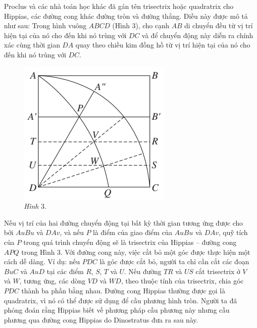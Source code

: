 \begin{multicols}{2}
	\vskip 0.1cm
	Proclus và các nhà toán học khác đã gán tên trisectrix hoặc quadratrix cho Hippias, các đường cong khác đường tròn và đường thẳng. Điều này được mô tả như sau: Trong hình vuông $ABCD$ (Hình $3$), cho cạnh $AB$ di chuyển đều từ vị trí hiện tại của nó cho đến khi nó trùng với $DC$ và để chuyển động này diễn ra chính xác cùng thời gian $DA$ quay theo chiều kim đồng hồ từ vị trí hiện tại của nó cho đến khi nó trùng với $DC$.
	\begin{figure}[H]
		\vspace*{-5pt}
		\centering
		\captionsetup{labelformat= empty, justification=centering}
		\includegraphics[width = 0.85\linewidth]{1}
		\caption{\small\textit{\color{lichsutoanhoc}Hình $3$.}}
		\vspace*{-10pt}
	\end{figure}
	Nếu vị trí của hai đường chuyển động tại bất kỳ thời gian tương ứng được cho bởi $AuBu$ và $DAv$, và nếu $P$ là điểm của giao điểm của $AuBu$ và $DAv$, quỹ tích của $P$ trong quá trình chuyển động sẽ là trisectrix của Hippias -- đường cong $APQ$ trong Hình $3$. Với đường cong này, việc cắt bỏ một góc được thực hiện một cách dễ dàng. Ví dụ: nếu $PDC$ là góc được cắt bỏ, người ta chỉ cần cắt các đoạn $BuC$ và $AuD$ tại các điểm $R$, $S$, $T$ và $U$. Nếu đường $TR$ và $US$ cắt trisectrix ở $V$ và $W$, tương ứng, các dòng $VD$ và $WD$, theo thuộc tính của trisectrix, chia góc $PDC$ thành ba phần bằng nhau. Đường cong Hippias thường được gọi là quadratrix, vì nó có thể được sử dụng để cầu phương hình tròn. Người ta đã phỏng đoán rằng Hippias biết về phương pháp cầu phương này nhưng cầu phương qua đường cong Hippias do Dinostratus đưa ra sau này.

\end{multicols}
